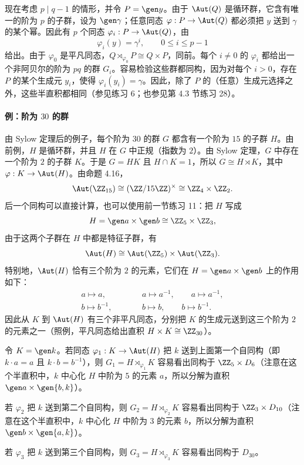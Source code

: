 现在考虑 $p\mid q-1$ 的情形，并令 $P=\gen y$。由于 $\Aut(Q)$ 是循环群，它含有唯一的阶为 $p$ 的子群，设为 $\gen\gamma$；任意同态 $\varphi:P\to\Aut(Q)$ 都必须把 $y$ 送到 $\gamma$ 的某个幂。因此有 $p$ 个同态 $\varphi_i:P\to\Aut(Q)$，由
\[
  \varphi_i(y)=\gamma^i,
  \qquad 0\leq i\leq p-1
\]
给出。由于 $\varphi_0$ 是平凡同态，$Q\rtimes_{\varphi_0}P\cong Q\times P$，同前。每个 $i\neq0$ 的 $\varphi_i$ 都给出一个非阿贝尔的阶为 $pq$ 的群 $G_i$。容易检验这些群都同构，因为对每个 $i>0$，存在 $P$ 的某个生成元 $y_i$，使得 $\varphi_i(y_i)=\gamma$。因此，除了 $P$ 的（任意）生成元选择之外，这些半直积都相同（参见练习 6；也参见第 4.3 节练习 28）。

\paragraph{例：阶为 $30$ 的群}
由 Sylow 定理后的例子，每个阶为 $30$ 的群 $G$ 都含有一个阶为 $15$ 的子群 $H$。由前例，$H$ 是循环群，并且 $H$ 在 $G$ 中正规（指数为 $2$）。由 Sylow 定理，$G$ 中存在一个阶为 $2$ 的子群 $K$。于是 $G=HK$ 且 $H\cap K=1$，所以 $G\cong H\rtimes K$，其中 $\varphi:K\to\Aut(H)$。由命题 4.16，
\[
  \Aut(\ZZ_{15})\cong(\ZZ/15\ZZ)^\times\cong\ZZ_4\times\ZZ_2.
\]
后一个同构可以直接计算，也可以使用前一节练习 11：把 $H$ 写成
\[
  H=\gen a\times\gen b\cong\ZZ_5\times\ZZ_3,
\]
由于这两个子群在 $H$ 中都是特征子群，有
\[
  \Aut(H)\cong\Aut(\ZZ_5)\times\Aut(\ZZ_3).
\]
特别地，$\Aut(H)$ 恰有三个阶为 $2$ 的元素，它们在 $H=\gen a\times\gen b$ 上的作用如下：
\[
\begin{array}{ccc}
 a\mapsto a, &\qquad& a\mapsto a^{-1}, \qquad a\mapsto a^{-1},\\
 b\mapsto b^{-1}, && b\mapsto b, \qquad b\mapsto b^{-1}.
\end{array}
\]
因此从 $K$ 到 $\Aut(H)$ 有三个非平凡同态，分别把 $K$ 的生成元送到这三个阶为 $2$ 的元素之一（照例，平凡同态给出直积 $H\times K\cong\ZZ_{30}$）。

令 $K=\gen k$。若同态 $\varphi_1:K\to\Aut(H)$ 把 $k$ 送到上面第一个自同构（即 $k\cdot a=a$ 且 $k\cdot b=b^{-1}$），则 $G_1=H\rtimes_{\varphi_1}K$ 容易看出同构于 $\ZZ_5\times D_6$（注意在这个半直积中，$k$ 中心化 $H$ 中阶为 $5$ 的元素 $a$，所以分解为直积 $\gen a\times\gen{b,k}$）。

若 $\varphi_2$ 把 $k$ 送到第二个自同构，则 $G_2=H\rtimes_{\varphi_2}K$ 容易看出同构于 $\ZZ_3\times D_{10}$（注意在这个半直积中，$k$ 中心化 $H$ 中阶为 $3$ 的元素 $b$，所以分解为直积 $\gen b\times\gen{a,k}$）。

若 $\varphi_3$ 把 $k$ 送到第三个自同构，则 $G_3=H\rtimes_{\varphi_3}K$ 容易看出同构于 $D_{30}$。

